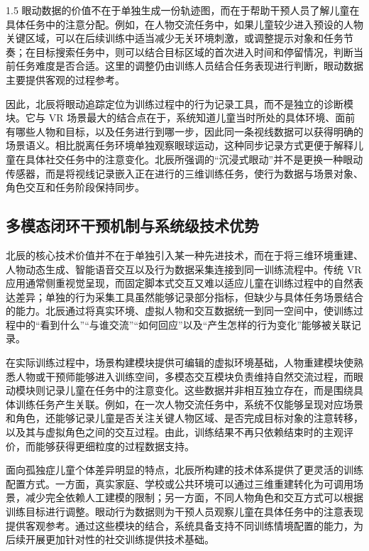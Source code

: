 \documentclass[zihao=-4]{ctexart}
\begin{document}
\begin{spacing}{1.5}
眼动数据的价值不在于单独生成一份轨迹图，而在于帮助干预人员了解儿童在具体任务中的注意分配。例如，在人物交流任务中，如果儿童较少进入预设的人物关键区域，可以在后续训练中适当减少无关环境刺激，或调整提示对象和任务节奏；在目标搜索任务中，则可以结合目标区域的首次进入时间和停留情况，判断当前任务难度是否合适。这里的调整仍由训练人员结合任务表现进行判断，眼动数据主要提供客观的过程参考。

因此，北辰将眼动追踪定位为训练过程中的行为记录工具，而不是独立的诊断模块。它与 VR 场景最大的结合点在于，系统知道儿童当时所处的具体环境、面前有哪些人物和目标，以及任务进行到哪一步，因此同一条视线数据可以获得明确的场景语义。相比脱离任务环境单独观察眼球运动，这种同步记录方式更便于解释儿童在具体社交任务中的注意变化。北辰所强调的“沉浸式眼动”并不是更换一种眼动传感器，而是将视线记录嵌入正在进行的三维训练任务，使行为数据与场景对象、角色交互和任务阶段保持同步。


\subsection{多模态闭环干预机制与系统级技术优势}

北辰的核心技术价值并不在于单独引入某一种先进技术，而在于将三维环境重建、人物动态生成、智能语音交互以及行为数据采集连接到同一训练流程中。传统 VR 应用通常侧重视觉呈现，而固定脚本式交互又难以适应儿童在训练过程中的自然表达差异；单独的行为采集工具虽然能够记录部分指标，但缺少与具体任务场景结合的能力。北辰通过将真实环境、虚拟人物和交互数据统一到同一空间中，使训练过程中的“看到什么”“与谁交流”“如何回应”以及“产生怎样的行为变化”能够被关联记录。

在实际训练过程中，场景构建模块提供可编辑的虚拟环境基础，人物重建模块使熟悉人物或干预师能够进入训练空间，多模态交互模块负责维持自然交流过程，而眼动模块则记录儿童在任务中的注意变化。这些数据并非相互独立存在，而是围绕具体训练任务产生关联。例如，在一次人物交流任务中，系统不仅能够呈现对应场景和角色，还能够记录儿童是否关注关键人物区域、是否完成目标对象的注意转移，以及其与虚拟角色之间的交互过程。由此，训练结果不再只依赖结束时的主观评价，而能够获得更细粒度的过程数据支持。

面向孤独症儿童个体差异明显的特点，北辰所构建的技术体系提供了更灵活的训练配置方式。一方面，真实家庭、学校或公共环境可以通过三维重建转化为可调用场景，减少完全依赖人工建模的限制；另一方面，不同人物角色和交互方式可以根据训练目标进行调整。眼动行为数据则为干预人员观察儿童在具体任务中的注意表现提供客观参考。通过这些模块的结合，系统具备支持不同训练情境配置的能力，为后续开展更加针对性的社交训练提供技术基础。


\end{spacing}
\end{document}
